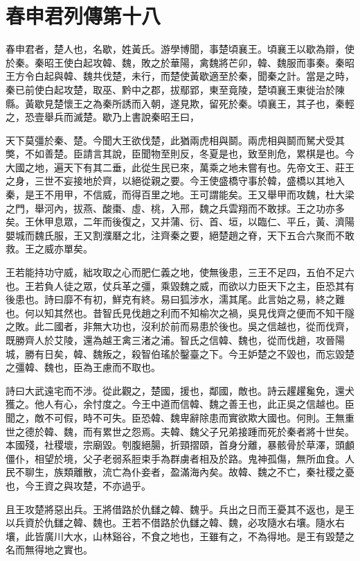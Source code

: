 \chapter{春申君列傳第十八}

春申君者，楚人也，名歇，姓黃氏。游學博聞，事楚頃襄王。頃襄王以歇為辯，使於秦。秦昭王使白起攻韓、魏，敗之於華陽，禽魏將芒卯，韓、魏服而事秦。秦昭王方令白起與韓、魏共伐楚，未行，而楚使黃歇適至於秦，聞秦之計。當是之時，秦已前使白起攻楚，取巫、黔中之郡，拔鄢郢，東至竟陵，楚頃襄王東徙治於陳縣。黃歇見楚懷王之為秦所誘而入朝，遂見欺，留死於秦。頃襄王，其子也，秦輕之，恐壹舉兵而滅楚。歇乃上書說秦昭王曰，

天下莫彊於秦、楚。今聞大王欲伐楚，此猶兩虎相與鬬。兩虎相與鬬而駑犬受其獘，不如善楚。臣請言其說，臣聞物至則反，冬夏是也，致至則危，累棋是也。今大國之地，遍天下有其二垂，此從生民已來，萬乘之地未嘗有也。先帝文王、莊王之身，三世不妄接地於齊，以絕從親之要。今王使盛橋守事於韓，盛橋以其地入秦，是王不用甲，不信威，而得百里之地。王可謂能矣。王又舉甲而攻魏，杜大梁之門，舉河內，拔燕、酸棗、虛、桃，入邢，魏之兵雲翔而不敢捄。王之功亦多矣。王休甲息眾，二年而後復之，又并蒲、衍、首、垣，以臨仁、平丘，黃、濟陽嬰城而魏氏服，王又割濮磿之北，注齊秦之要，絕楚趙之脊，天下五合六聚而不敢救。王之威亦單矣。

王若能持功守威，絀攻取之心而肥仁義之地，使無後患，三王不足四，五伯不足六也。王若負人徒之眾，仗兵革之彊，乘毀魏之威，而欲以力臣天下之主，臣恐其有後患也。詩曰靡不有初，鮮克有終。易曰狐涉水，濡其尾。此言始之易，終之難也。何以知其然也。昔智氏見伐趙之利而不知榆次之禍，吳見伐齊之便而不知干隧之敗。此二國者，非無大功也，沒利於前而易患於後也。吳之信越也，從而伐齊，既勝齊人於艾陵，還為越王禽三渚之浦。智氏之信韓、魏也，從而伐趙，攻晉陽城，勝有日矣，韓、魏叛之，殺智伯瑤於鑿臺之下。今王妒楚之不毀也，而忘毀楚之彊韓、魏也，臣為王慮而不取也。

詩曰大武遠宅而不涉。從此觀之，楚國，援也，鄰國，敵也。詩云趯趯毚免，還犬獲之。他人有心，余忖度之。今王中道而信韓、魏之善王也，此正吳之信越也。臣聞之，敵不可假，時不可失。臣恐韓、魏卑辭除患而實欲欺大國也。何則。王無重世之德於韓、魏，而有累世之怨焉。夫韓、魏父子兄弟接踵而死於秦者將十世矣。本國殘，社稷壞，宗廟毀。刳腹絕腸，折頸摺頤，首身分離，暴骸骨於草澤，頭顱僵仆，相望於境，父子老弱系脰束手為群虜者相及於路。鬼神孤傷，無所血食。人民不聊生，族類離散，流亡為仆妾者，盈滿海內矣。故韓、魏之不亡，秦社稷之憂也，今王資之與攻楚，不亦過乎。

且王攻楚將惡出兵。王將借路於仇讎之韓、魏乎。兵出之日而王憂其不返也，是王以兵資於仇讎之韓、魏也。王若不借路於仇讎之韓、魏，必攻隨水右壤。隨水右壤，此皆廣川大水，山林谿谷，不食之地也，王雖有之，不為得地。是王有毀楚之名而無得地之實也。

